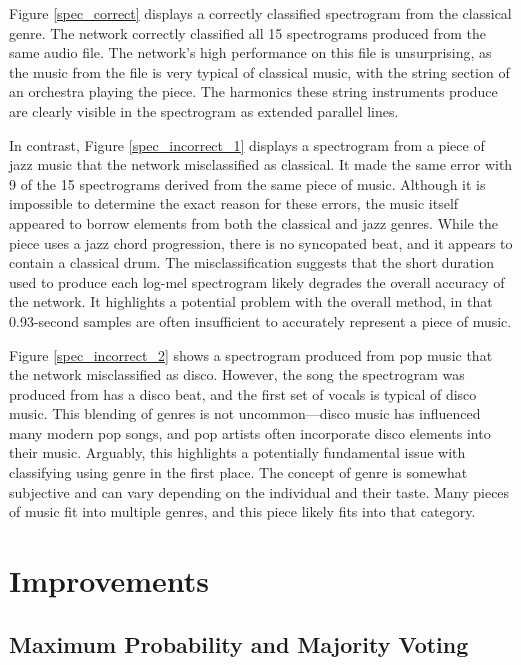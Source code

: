 \documentclass[conference]{IEEEtran}
\begin{document}
Figure \ref{spec_correct} displays a correctly classified spectrogram from the classical genre.
The network correctly classified all 15 spectrograms produced from the same audio file.
The network's high performance on this file is unsurprising, as the music from the file is very typical of classical music, with the string section of an orchestra playing the piece.
The harmonics these string instruments produce are clearly visible in the spectrogram as extended parallel lines.

In contrast, Figure \ref{spec_incorrect_1} displays a spectrogram from a piece of jazz music that the network misclassified as classical.
It made the same error with 9 of the 15 spectrograms derived from the same piece of music.
Although it is impossible to determine the exact reason for these errors, the music itself appeared to borrow elements from both the classical and jazz genres.
While the piece uses a jazz chord progression, there is no syncopated beat, and it appears to contain a classical drum.
The misclassification suggests that the short duration used to produce each log-mel spectrogram likely degrades the overall accuracy of the network. 
It highlights a potential problem with the overall method, in that 0.93-second samples are often insufficient to accurately represent a piece of music.

Figure \ref{spec_incorrect_2} shows a spectrogram produced from pop music that the network misclassified as disco.
However, the song the spectrogram was produced from has a disco beat, and the first set of vocals is typical of disco music.
This blending of genres is not uncommon---disco music has influenced many modern pop songs, and pop artists often incorporate disco elements into their music.
Arguably, this highlights a potentially fundamental issue with classifying using genre in the first place.
The concept of genre is somewhat subjective and can vary depending on the individual and their taste.
Many pieces of music fit into multiple genres, and this piece likely fits into that category.

\section{Improvements}

\subsection{Maximum Probability and Majority Voting}
\end{document}
